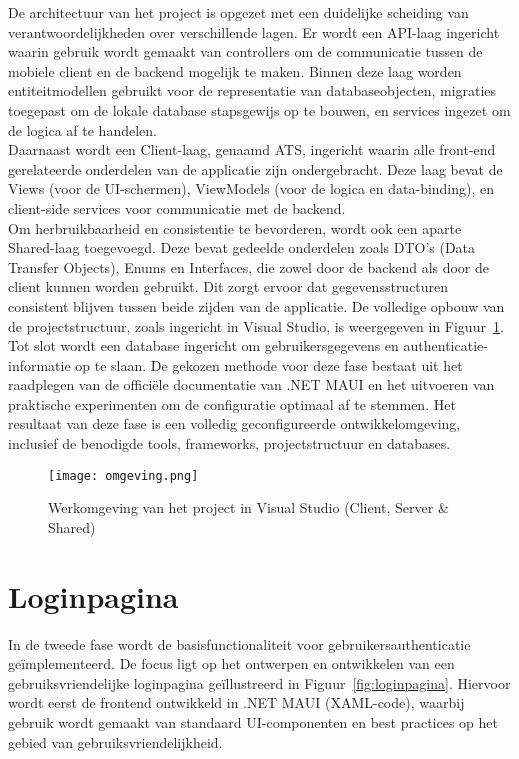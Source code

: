 De architectuur van het project is opgezet met een duidelijke scheiding van verantwoordelijkheden over verschillende lagen. Er wordt een API-laag ingericht waarin gebruik wordt gemaakt van controllers om de communicatie tussen de mobiele client en de backend mogelijk te maken. Binnen deze laag worden entiteitmodellen gebruikt voor de representatie van databaseobjecten, migraties toegepast om de lokale database stapsgewijs op te bouwen, en services ingezet om de logica af te handelen.\\

Daarnaast wordt een Client-laag, genaamd ATS, ingericht waarin alle front-end gerelateerde onderdelen van de applicatie zijn ondergebracht. Deze laag bevat de Views (voor de UI-schermen), ViewModels (voor de logica en data-binding), en client-side services voor communicatie met de backend. \\

Om herbruikbaarheid en consistentie te bevorderen, wordt ook een aparte Shared-laag toegevoegd. Deze bevat gedeelde onderdelen zoals DTO's (Data Transfer Objects), Enums en Interfaces, die zowel door de backend als door de client kunnen worden gebruikt. Dit zorgt ervoor dat gegevensstructuren consistent blijven tussen beide zijden van de applicatie. De volledige opbouw van de projectstructuur, zoals ingericht in Visual Studio, is weergegeven in Figuur~\ref{fig:omgeving}. \\

Tot slot wordt een database ingericht om gebruikersgegevens en authenticatie-informatie op te slaan. De gekozen methode voor deze fase bestaat uit het raadplegen van de officiële documentatie van .NET MAUI en het uitvoeren van praktische experimenten om de configuratie optimaal af te stemmen. Het resultaat van deze fase is een volledig geconfigureerde ontwikkelomgeving, inclusief de benodigde tools, frameworks, projectstructuur en databases.\\

\begin{figure}[H]
    \centering
    \texttt{[image: omgeving.png]}
    \caption{Werkomgeving van het project in Visual Studio (Client, Server & Shared)}
    \label{fig:omgeving}
\end{figure}

\section{Loginpagina}

In de tweede fase wordt de basisfunctionaliteit voor gebruikersauthenticatie geïmplementeerd. De focus ligt op het ontwerpen en ontwikkelen van een gebruiksvriendelijke loginpagina geïllustreerd in Figuur~\ref{fig:loginpagina}. Hiervoor wordt eerst de frontend ontwikkeld in .NET MAUI (XAML-code), waarbij gebruik wordt gemaakt van standaard UI-componenten en best practices op het gebied van gebruiksvriendelijkheid. \\

